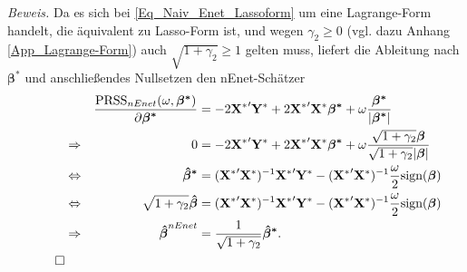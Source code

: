 \documentclass[12pt, a4paper]{report}\usepackage[]{graphicx}\usepackage[]{color}
\begin{document}
\begin{appendix}
\noindent \textit{Beweis.} Da es sich bei \eqref{Eq_Naiv_Enet_Lassoform} um eine Lagrange-Form handelt, die äquivalent zu Lasso-Form ist, und wegen $\gamma_2 \geq 0$ (vgl. dazu Anhang \ref{App_Lagrange-Form}) auch $\sqrt{1+\gamma_2} \geq 1$ gelten muss, liefert die Ableitung nach $\boldsymbol{\beta^*}$ und anschließendes Nullsetzen den nEnet-Schätzer
\begin{align*}
&& \frac{\textnormal{PRSS}_{nEnet}(\omega, \boldsymbol{\beta^*})}{\partial \boldsymbol{\beta^*}}
&=-2\mathbf{X^*}'\mathbf{Y^*}+2\mathbf{X^*}'\mathbf{X^*}\boldsymbol{\beta^*} + \omega \frac{\boldsymbol{\beta^*}}{|\boldsymbol{\beta^*}|} \\
&\Rightarrow & 0 &= -2\mathbf{X^*}'\mathbf{Y^*}+2\mathbf{X^*}'\mathbf{X^*}\boldsymbol{\beta^*} + \omega \frac{\sqrt{1+\gamma_2}\boldsymbol{\beta}}{\sqrt{1+\gamma_2}|\boldsymbol{\beta}|} \\
&\Leftrightarrow &\boldsymbol{\hat{\beta}^*} &= (\mathbf{X^*}'\mathbf{X^*})^{-1}\mathbf{X^*}'\mathbf{Y^*} - (\mathbf{X^*}'\mathbf{X^*})^{-1} \frac{\omega}{2} \textnormal{sign}(\boldsymbol{\beta}) \\
&\Leftrightarrow &\sqrt{1+\gamma_2}\boldsymbol{\hat{\beta}} &= (\mathbf{X^*}'\mathbf{X^*})^{-1}\mathbf{X^*}'\mathbf{Y^*} - (\mathbf{X^*}'\mathbf{X^*})^{-1} \frac{\omega}{2} \textnormal{sign}(\boldsymbol{\beta}) \\
&\Rightarrow & \boldsymbol{\hat{\beta}}^{nEnet} &= \frac{1}{\sqrt{1+\gamma_2}}\boldsymbol{\hat{\beta}^*}. \\ 
\tag*{$\square$} 
\end{align*}


\end{appendix}
\end{document}
